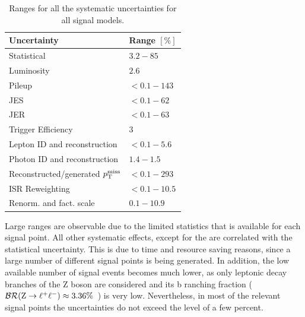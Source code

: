 \begin{table}[tbp]
 \centering
 \caption{Ranges for all the systematic uncertainties for all signal models.}
 \normalsize
 \label{tab:systuncSignal}
 \begin{tabular}[width=\textwidth]{ll}
  Uncertainty                       & Range $[\%]$ \\\hline
  Statistical                       & $3.2-85$     \\
  Luminosity                        & $2.6$        \\
  Pileup                            & $<0.1-143$   \\
  JES                               & $<0.1-62$    \\
  JER                               & $<0.1-63$    \\
  Trigger Efficiency                & $3$          \\
  Lepton ID and reconstruction      & $<0.1-5.6$   \\
  Photon ID and reconstruction      & $1.4-1.5$    \\
  Reconstructed/generated $p_{\mathrm{T}}^\text{miss}$ & $<0.1-293$   \\
  ISR Reweighting                   & $<0.1-10.5$  \\
  Renorm. and fact. scale           & $0.1-10.9$   \\
  \hline
 \end{tabular}
\end{table}
Large ranges are observable due to the limited statistics that is available for each signal point. All other systematic effects, except for the  are correlated with the statistical uncertainty. This is due to time and resource saving reasons, since a large number of different signal points is being generated. In addition, the low available number of signal events becomes much lower, as only leptonic decay branches of the Z boson are considered and its b
ranching fraction ($\mathcal{BR}(\mathrm{Z}\to\ell^+\ell^-)\approx3.36\%$~\cite{PDG}) is very low. Nevertheless, in most of the relevant signal points the uncertainties do not exceed the level of a few percent.

